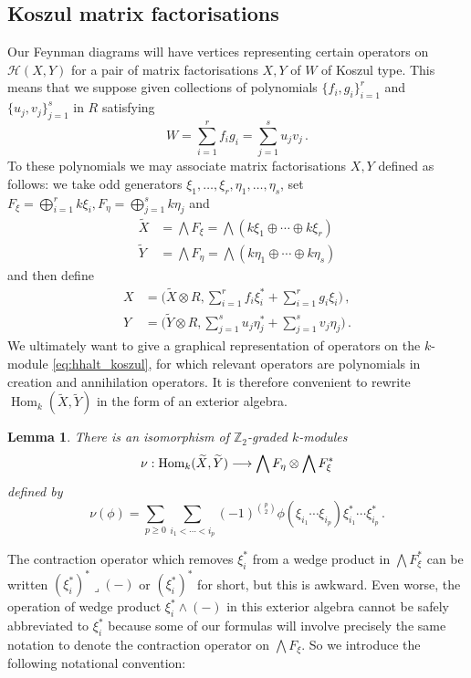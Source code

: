 \documentclass[english,letter paper,12pt,leqno]{article}
\newtheorem{lemma}[theorem]{Lemma}
\theoremstyle{example}
\numberwithin{equation}{section}
\def\HH{\HH}
\def\HH{\mathcal{H}}
\def\Hom{\operatorname{Hom}}
\def\nZ{\mathds{Z}}
\begin{document}
\subsection{Koszul matrix factorisations}\label{section:koszul_mf}

Our Feynman diagrams will have vertices representing certain operators on $\HH(X,Y)$ for a pair of matrix factorisations $X,Y$ of $W$ of Koszul type. This means that we suppose given collections of polynomials $\{ f_i, g_i \}_{i=1}^r$ and $\{ u_j, v_j \}_{j=1}^s$ in $R$ satisfying
\[
W = \sum_{i=1}^r f_i g_i = \sum_{j=1}^s u_j v_j\,.
\]
To these polynomials we may associate matrix factorisations $X,Y$ defined as follows: we take odd generators $\xi_1,\ldots,\xi_r,\eta_1,\ldots,\eta_s$, set $F_\xi = \bigoplus_{i=1}^r k \xi_i, F_\eta = \bigoplus_{j=1}^s k \eta_j$ and
\begin{align*}
\widetilde{X} &= \bigwedge F_\xi = \bigwedge( k \xi_1 \oplus \cdots \oplus k \xi_r )\\
\widetilde{Y} &= \bigwedge F_\eta = \bigwedge( k \eta_1 \oplus \cdots \oplus k \eta_s )
\end{align*}
and then define
\begin{align}
X &= \big( \widetilde{X} \otimes R, \sum_{i=1}^r f_i \xi_i^* + \sum_{i=1}^r g_i \xi_i \big)\,,\label{eq:defn_X_tilde}\\
Y &= \big( \widetilde{Y} \otimes R, \sum_{j=1}^s u_j \eta_j^* + \sum_{j=1}^s v_j \eta_j \big)\,.\label{eq:defn_Y_tilde}
\end{align}
We ultimately want to give a graphical representation of operators on the $k$-module \eqref{eq:hhalt_koszul}, for which relevant operators are polynomials in creation and annihilation operators. It is therefore convenient to rewrite $\Hom_k( \widetilde{X}, \widetilde{Y} )$ in the form of an exterior algebra.

\begin{lemma}\label{lemma:iso_nu} There is an isomorphism of $\nZ_2$-graded $k$-modules
\[
\nu: \Hom_k( \widetilde{X}, \widetilde{Y} ) \lto \bigwedge F_\eta \otimes \bigwedge F_\xi^* 
\]
defined by
\[
\nu( \phi ) = \sum_{p \ge 0} \sum_{i_1 < \cdots < i_p} (-1)^{\binom{p}{2}} \phi( \xi_{i_1} \cdots \xi_{i_p} ) \xi_{i_1}^* \cdots \xi_{i_p}^*\,.
\]
\end{lemma}

The contraction operator which removes $\xi^*_i$ from a wedge product in $\bigwedge F_\xi^*$ can be written $(\xi_i^*)^* \lrcorner (-)$ or $(\xi_i^*)^*$ for short, but this is awkward. Even worse, the operation of wedge product $\xi_i^* \wedge (-)$ in this exterior algebra cannot be safely abbreviated to $\xi_i^*$ because some of our formulas will involve precisely the same notation to denote the contraction operator on $\bigwedge F_\xi$. So we introduce the following notational convention:
\end{document}
